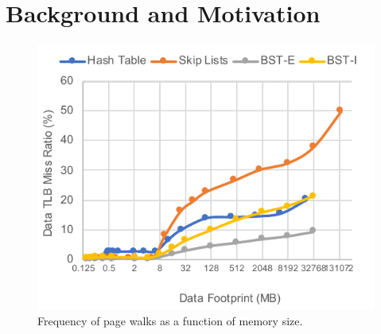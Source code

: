 \section{Background and Motivation}
\label{sec:background}

\begin{figure}[t]
   \centering
   \includegraphics[width=1.0\columnwidth]{graphs/pagewalks.pdf}
   \caption{Frequency of page walks as a function of memory size.}
   \label{fig:pagewalks}
\end{figure}


